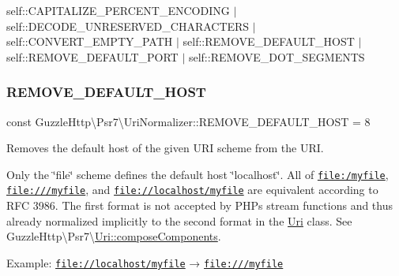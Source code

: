 self\+::\+C\+A\+P\+I\+T\+A\+L\+I\+Z\+E\+\_\+\+P\+E\+R\+C\+E\+N\+T\+\_\+\+E\+N\+C\+O\+D\+I\+NG $\vert$ self\+::\+D\+E\+C\+O\+D\+E\+\_\+\+U\+N\+R\+E\+S\+E\+R\+V\+E\+D\+\_\+\+C\+H\+A\+R\+A\+C\+T\+E\+RS $\vert$ self\+::\+C\+O\+N\+V\+E\+R\+T\+\_\+\+E\+M\+P\+T\+Y\+\_\+\+P\+A\+TH $\vert$ self\+::\+R\+E\+M\+O\+V\+E\+\_\+\+D\+E\+F\+A\+U\+L\+T\+\_\+\+H\+O\+ST $\vert$ self\+::\+R\+E\+M\+O\+V\+E\+\_\+\+D\+E\+F\+A\+U\+L\+T\+\_\+\+P\+O\+RT $\vert$ self\+::\+R\+E\+M\+O\+V\+E\+\_\+\+D\+O\+T\+\_\+\+S\+E\+G\+M\+E\+N\+TS \mbox{\label{classGuzzleHttp_1_1Psr7_1_1UriNormalizer_a185836fe2ddc337a4581a02abc603d8f}} 
\subsubsection{\texorpdfstring{R\+E\+M\+O\+V\+E\+\_\+\+D\+E\+F\+A\+U\+L\+T\+\_\+\+H\+O\+ST}{REMOVE\_DEFAULT\_HOST}}
{\footnotesize\ttfamily const Guzzle\+Http\textbackslash{}\+Psr7\textbackslash{}\+Uri\+Normalizer\+::\+R\+E\+M\+O\+V\+E\+\_\+\+D\+E\+F\+A\+U\+L\+T\+\_\+\+H\+O\+ST = 8}

Removes the default host of the given U\+RI scheme from the U\+RI.

Only the \char`\"{}file\char`\"{} scheme defines the default host \char`\"{}localhost\char`\"{}. All of {\ttfamily \href{file:/myfile}{\tt file\+:/myfile}}, {\ttfamily \href{file:///myfile}{\tt file\+:///myfile}}, and {\ttfamily \href{file://localhost/myfile}{\tt file\+://localhost/myfile}} are equivalent according to R\+FC 3986. The first format is not accepted by P\+H\+Ps stream functions and thus already normalized implicitly to the second format in the \hyperlink{classGuzzleHttp_1_1Psr7_1_1Uri}{Uri} class. See {\ttfamily Guzzle\+Http\textbackslash{}Psr7\textbackslash{}\hyperlink{classGuzzleHttp_1_1Psr7_1_1Uri_a55774932d840a511df95f7e7ca8e8598}{Uri\+::compose\+Components}}.

Example\+: \href{file://localhost/myfile}{\tt file\+://localhost/myfile} → \href{file:///myfile}{\tt file\+:///myfile} \mbox{\label{classGuzzleHttp_1_1Psr7_1_1UriNormalizer_aacb5df77fe58dcf0358d8b69092adced}} 
